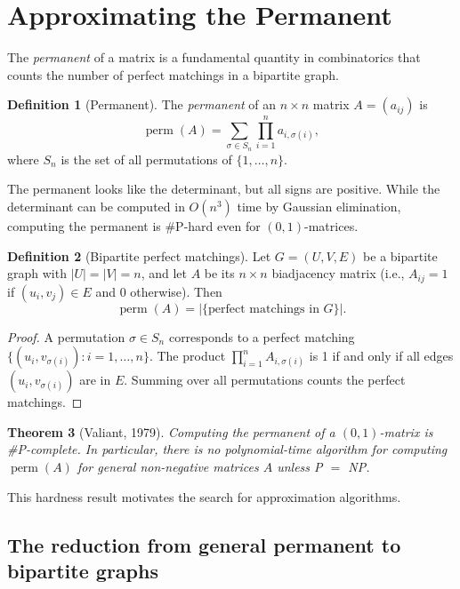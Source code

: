 \documentclass[twoside,12pt]{book}
\theoremstyle{plain}
\newtheorem{theorem}{Theorem}[chapter]
\theoremstyle{definition}
\newtheorem{definition}[theorem]{Definition}
\theoremstyle{remark}
\begin{document}
\section{Approximating the Permanent}
\label{sec:permanent}

The \emph{permanent} of a matrix is a fundamental quantity in combinatorics that counts the number of perfect matchings in a bipartite graph.

\begin{definition}[Permanent]
The \emph{permanent} of an $n \times n$ matrix $A = (a_{ij})$ is
\[
\operatorname{perm}(A) = \sum_{\sigma \in S_n} \prod_{i=1}^n a_{i,\sigma(i)},
\]
where $S_n$ is the set of all permutations of $\{1, \ldots, n\}$.
\end{definition}

The permanent looks like the determinant, but all signs are positive. While the determinant can be computed in $O(n^3)$ time by Gaussian elimination, computing the permanent is \#P-hard even for $(0,1)$-matrices.

\begin{definition}[Bipartite perfect matchings]
Let $G = (U, V, E)$ be a bipartite graph with $|U| = |V| = n$, and let $A$ be its $n \times n$ biadjacency matrix (i.e., $A_{ij} = 1$ if $(u_i, v_j) \in E$ and 0 otherwise). Then
\[
\operatorname{perm}(A) = |\{\text{perfect matchings in } G\}|.
\]
\end{definition}

\begin{proof}
A permutation $\sigma \in S_n$ corresponds to a perfect matching $\{(u_i, v_{\sigma(i)}) : i = 1, \ldots, n\}$. The product $\prod_{i=1}^n A_{i,\sigma(i)}$ is 1 if and only if all edges $(u_i, v_{\sigma(i)})$ are in $E$. Summing over all permutations counts the perfect matchings.
\end{proof}

\begin{theorem}[Valiant, 1979]
\label{thm:valiant}
Computing the permanent of a $(0,1)$-matrix is \#P-complete. In particular, there is no polynomial-time algorithm for computing $\operatorname{perm}(A)$ for general non-negative matrices $A$ unless P $=$ NP.
\end{theorem}

This hardness result motivates the search for approximation algorithms.

\subsection{The reduction from general permanent to bipartite graphs}
\end{document}
